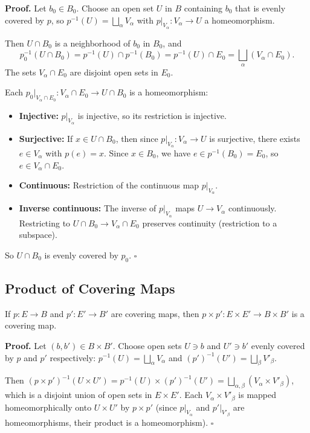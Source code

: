 \documentclass[11pt]{report}
\renewenvironment{proof}[1][Proof]{\noindent\textbf{#1.} }{\hfill$\square$\par\vspace{5pt}}
\begin{document}
\begin{proof}
Let $b_0 \in B_0$. Choose an open set $U$ in $B$ containing $b_0$ that is evenly covered by $p$, so $p^{-1}(U) = \bigsqcup_\alpha V_\alpha$ with $p|_{V_\alpha}: V_\alpha \to U$ a homeomorphism.

Then $U \cap B_0$ is a neighborhood of $b_0$ in $B_0$, and
\[p_0^{-1}(U \cap B_0) = p^{-1}(U) \cap p^{-1}(B_0) = p^{-1}(U) \cap E_0 = \bigsqcup_\alpha (V_\alpha \cap E_0).\]
The sets $V_\alpha \cap E_0$ are disjoint open sets in $E_0$.

Each $p_0|_{V_\alpha \cap E_0}: V_\alpha \cap E_0 \to U \cap B_0$ is a homeomorphism:
\begin{itemize}[nosep]
    \item \textbf{Injective:} $p|_{V_\alpha}$ is injective, so its restriction is injective.
    \item \textbf{Surjective:} If $x \in U \cap B_0$, then since $p|_{V_\alpha}: V_\alpha \to U$ is surjective, there exists $e \in V_\alpha$ with $p(e) = x$. Since $x \in B_0$, we have $e \in p^{-1}(B_0) = E_0$, so $e \in V_\alpha \cap E_0$.
    \item \textbf{Continuous:} Restriction of the continuous map $p|_{V_\alpha}$.
    \item \textbf{Inverse continuous:} The inverse of $p|_{V_\alpha}$ maps $U \to V_\alpha$ continuously. Restricting to $U \cap B_0 \to V_\alpha \cap E_0$ preserves continuity (restriction to a subspace).
\end{itemize}
So $U \cap B_0$ is evenly covered by $p_0$.
\end{proof}

\subsection{Product of Covering Maps}

\begin{thmbox}
If $p: E \to B$ and $p': E' \to B'$ are covering maps, then $p \times p': E \times E' \to B \times B'$ is a covering map.
\end{thmbox}

\begin{proof}
Let $(b, b') \in B \times B'$. Choose open sets $U \ni b$ and $U' \ni b'$ evenly covered by $p$ and $p'$ respectively: $p^{-1}(U) = \bigsqcup_\alpha V_\alpha$ and $(p')^{-1}(U') = \bigsqcup_\beta V'_\beta$.

Then $(p \times p')^{-1}(U \times U') = p^{-1}(U) \times (p')^{-1}(U') = \bigsqcup_{\alpha, \beta} (V_\alpha \times V'_\beta)$, which is a disjoint union of open sets in $E \times E'$. Each $V_\alpha \times V'_\beta$ is mapped homeomorphically onto $U \times U'$ by $p \times p'$ (since $p|_{V_\alpha}$ and $p'|_{V'_\beta}$ are homeomorphisms, their product is a homeomorphism).
\end{proof}
\end{document}
